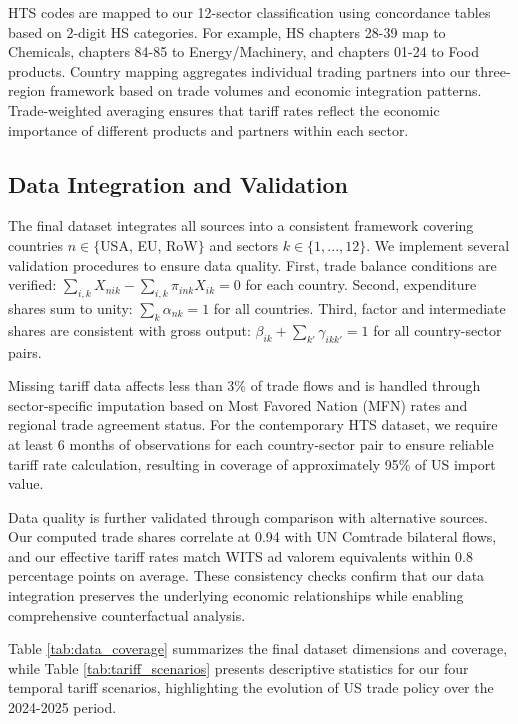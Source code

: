 HTS codes are mapped to our 12-sector classification using concordance tables based on 2-digit HS categories. For example, HS chapters 28-39 map to Chemicals, chapters 84-85 to Energy/Machinery, and chapters 01-24 to Food products. Country mapping aggregates individual trading partners into our three-region framework based on trade volumes and economic integration patterns. Trade-weighted averaging ensures that tariff rates reflect the economic importance of different products and partners within each sector.

\subsection{Data Integration and Validation}

The final dataset integrates all sources into a consistent framework covering countries $n \in \{$USA, EU, RoW$\}$ and sectors $k \in \{1, ..., 12\}$. We implement several validation procedures to ensure data quality. First, trade balance conditions are verified: $\sum_{i,k} X_{nik} - \sum_{i,k} \pi_{ink} X_{ik} = 0$ for each country. Second, expenditure shares sum to unity: $\sum_{k} \alpha_{nk} = 1$ for all countries. Third, factor and intermediate shares are consistent with gross output: $\beta_{ik} + \sum_{k'} \gamma_{ikk'} = 1$ for all country-sector pairs.

Missing tariff data affects less than 3\% of trade flows and is handled through sector-specific imputation based on Most Favored Nation (MFN) rates and regional trade agreement status. For the contemporary HTS dataset, we require at least 6 months of observations for each country-sector pair to ensure reliable tariff rate calculation, resulting in coverage of approximately 95\% of US import value.

Data quality is further validated through comparison with alternative sources. Our computed trade shares correlate at 0.94 with UN Comtrade bilateral flows, and our effective tariff rates match WITS ad valorem equivalents within 0.8 percentage points on average. These consistency checks confirm that our data integration preserves the underlying economic relationships while enabling comprehensive counterfactual analysis.

Table \ref{tab:data_coverage} summarizes the final dataset dimensions and coverage, while Table \ref{tab:tariff_scenarios} presents descriptive statistics for our four temporal tariff scenarios, highlighting the evolution of US trade policy over the 2024-2025 period.
